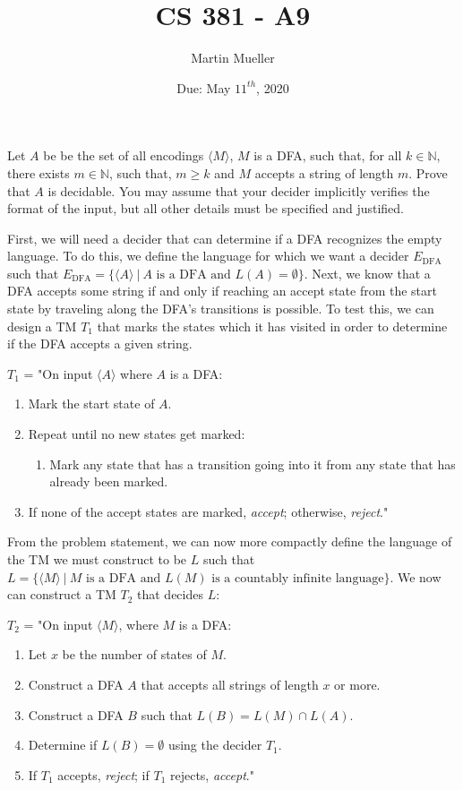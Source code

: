 \documentclass[11pt letter]{article}
\title{CS 381 - A9}
\author{Martin Mueller}
\date{Due: May $11^{th}$, 2020}
\begin{document}
\maketitle

Let $A$ be be the set of all encodings $\langle M \rangle$, $M$ is a DFA, such that, for all $k \in \mathbb{N}$, there exists $m \in \mathbb{N}$, such that, $m \ge k$ and $M$ accepts a string of length $m$. Prove that $A$ is decidable. You may assume that your decider implicitly verifies the format of the input, but all other details must be specified and justified.

First, we will need a decider that can determine if a DFA recognizes the empty language. To do this, we define the language for which we want a decider $E_{\text{DFA}}$ such that $E_{\text{DFA}} = \{\langle A \rangle \ | \ A \text{ is a DFA and } L(A) = \emptyset\}$. Next, we know that a DFA accepts some string if and only if reaching an accept state from the start state by traveling along the DFA's transitions is possible. To test this, we can design a TM $T_{1}$ that marks the states which it has visited in order to determine if the DFA accepts a given string.

$T_{1}$ = "On input $\langle A \rangle$ where $A$ is a DFA:
\begin{enumerate}
    \item Mark the start state of $A$.
    \item Repeat until no new states get marked:
    \begin{enumerate}
        \item  Mark any state that has a transition going into it from any state that has already been marked.
    \end{enumerate}
    \item If none of the accept states are marked, \textit{accept}; otherwise, \textit{reject}."
\end{enumerate}

From the problem statement, we can now more compactly define the language of the TM we must construct to be $L$ such that $L = \{\langle M \rangle \ | \ M \text{ is a DFA and } L(M) \text{ is a countably infinite language}\}$. We now can construct a TM $T_{2}$ that decides $L$:

$T_{2}$ = "On input $\langle M \rangle$, where $M$ is a DFA:
\begin{enumerate}
    \item Let $x$ be the number of states of $M$.
    \item Construct a DFA $A$ that accepts all strings of length $x$ or more.
    \item Construct a DFA $B$ such that $L(B) = L(M) \cap L(A)$.
    \item Determine if $L(B) = \emptyset$ using the decider $T_{1}$.
    \item If $T_{1}$ accepts, \textit{reject}; if $T_{1}$ rejects, \textit{accept}."
\end{enumerate}
\end{document}
